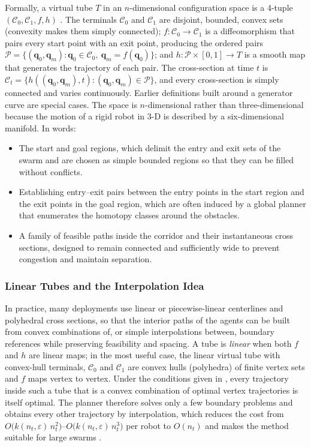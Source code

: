 Formally, a virtual tube $T$ in an $n$-dimensional configuration space is a
4-tuple $(\mathcal{C}_0, \mathcal{C}_1, f, h)$ \cite{mao2023optimal}. The
terminals $\mathcal{C}_0$ and $\mathcal{C}_1$ are disjoint, bounded, convex sets
(convexity makes them simply connected); $f : \mathcal{C}_0 \to \mathcal{C}_1$ is
a diffeomorphism that pairs every start point with an exit point, producing the
ordered pairs $\mathcal{P} = \{(\mathbf{q}_0, \mathbf{q}_m) : \mathbf{q}_0 \in
\mathcal{C}_0,\ \mathbf{q}_m = f(\mathbf{q}_0)\}$; and
$h : \mathcal{P} \times [0,1] \to T$ is a smooth map that generates the
trajectory of each pair. The cross-section at time $t$ is
$\mathcal{C}_t = \{h((\mathbf{q}_0,\mathbf{q}_m), t) : (\mathbf{q}_0,\mathbf{q}_m)
\in \mathcal{P}\}$, and every cross-section is simply connected and varies
continuously. Earlier definitions built around a generator curve are special
cases. The space is $n$-dimensional rather than three-dimensional because the
motion of a rigid robot in 3-D is described by a six-dimensional manifold.
In words:
\begin{itemize}
  \item {} The start and goal regions, which delimit the entry and
        exit sets of the swarm and are chosen as simple bounded regions so that
        they can be filled without conflicts.
  \item {} Establishing entry--exit pairs between the
        entry points in the start region and the exit points in the goal region,
        which are often induced by a global planner that enumerates the homotopy
        classes around the obstacles.
  \item {} A family of feasible paths inside the
        corridor and their instantaneous cross sections, designed to remain
        connected and sufficiently wide to prevent congestion and maintain
        separation.
\end{itemize}

\subsubsection{Linear Tubes and the Interpolation Idea}

In practice, many deployments use linear or piecewise-linear centerlines and
polyhedral cross sections, so that the interior paths of the agents can be built
from convex combinations of, or simple interpolations between, boundary
references while preserving feasibility and spacing. A tube is \emph{linear} when
both $f$ and $h$ are linear maps; in the most useful case, the linear virtual
tube with convex-hull terminals, $\mathcal{C}_0$ and $\mathcal{C}_1$ are convex
hulls (polyhedra) of finite vertex sets and $f$ maps vertex to vertex. Under the
conditions given in \cite{mao2023optimal}, every trajectory inside such a tube
that is a convex combination of optimal vertex trajectories is itself optimal.
The planner therefore solves only a few boundary problems and obtains every other
trajectory by interpolation, which reduces the cost from
$O\bigl(k(n_t,\varepsilon)\,n_t^{2}\bigr)$--$O\bigl(k(n_t,\varepsilon)\,n_t^{3}\bigr)$
per robot to $O(n_t)$ and makes the method suitable for large swarms
\cite{mao2023optimal}.

